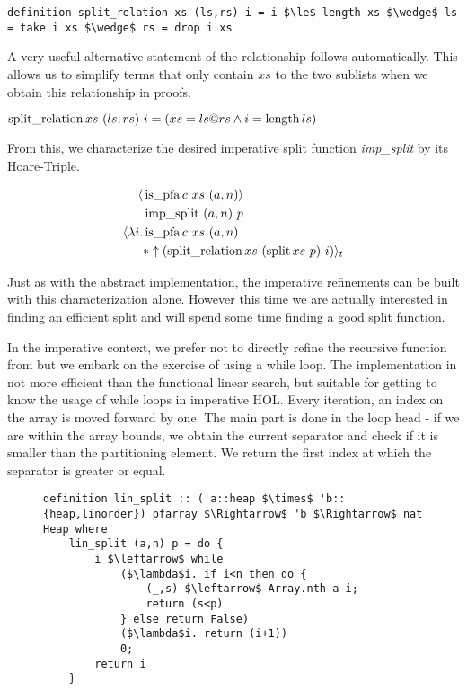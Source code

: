 \begin{lstlisting}[mathescape=true, language=Isabelle]
definition split_relation xs (ls,rs) i = i $\le$ length xs $\wedge$ ls = take i xs $\wedge$ rs = drop i xs
\end{lstlisting}

A very useful alternative statement of the relationship follows automatically.
This allows us to simplify terms that only contain $xs$
to the two sublists when we obtain this relationship in proofs.

\begin{lemma}
    $\operatorname{split\_relation} xs\ (ls,rs)\ i = (xs = ls@rs \wedge i = \operatorname{length} ls)$
\end{lemma}

From this, we characterize the desired imperative
split function \textit{imp\_split} by its Hoare-Triple.

\begin{align*}
    \langle & \operatorname{is\_pfa} c\ xs\ (a,n) \rangle \\
            & \operatorname{imp\_split}\ (a,n)\ p \\
\langle\lambda i. & \operatorname{is\_pfa} c\ xs\ (a,n)\\
& * \uparrow(\operatorname{split\_relation} xs\ (\operatorname{split} xs\ p)\ i)\rangle_t
\end{align*}

Just as with the abstract implementation,
the imperative refinements can be built with this characterization alone.
However this time we are actually interested in finding an
efficient split and will spend some time finding
a good split function.

In the imperative context, we prefer not to directly
refine the recursive function from 
but we embark on the exercise of using a while loop.
The implementation in 
not more efficient than the functional linear search,
but suitable for getting to know
the usage of while loops in imperative HOL.
Every iteration, an index on the array is moved forward by one.
The main part is done in the loop head - if we
are within the array bounds,
we obtain the current separator and check if it is
smaller than the partitioning element.
We return the first index at which the separator is greater or equal.

\begin{figure}
\begin{lstlisting}[mathescape=true, language=Isabelle, caption={The imperative linear split},
    label={lst:imp-linear-split}]
definition lin_split :: ('a::heap $\times$ 'b::{heap,linorder}) pfarray $\Rightarrow$ 'b $\Rightarrow$ nat Heap where
    lin_split (a,n) p = do { 
        i $\leftarrow$ while  
            ($\lambda$i. if i<n then do { 
                (_,s) $\leftarrow$ Array.nth a i; 
                return (s<p) 
            } else return False)  
            ($\lambda$i. return (i+1))  
            0; 
        return i 
    }
\end{lstlisting}
\end{figure}


